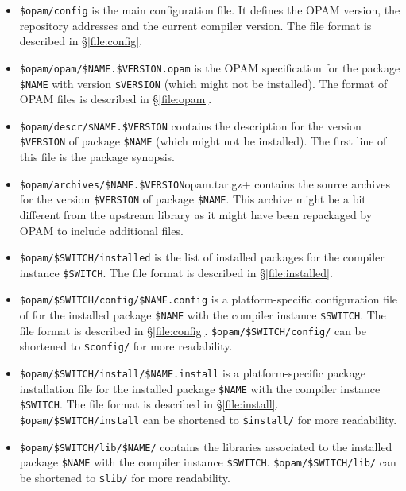 \documentclass[a4paper,11pt]{article}
\begin{document}
\begin{itemize}

\item {\tt \$opam/config} is the main configuration file. It defines
  the OPAM version, the repository addresses and the current compiler
  version. The file format is described in \S\ref{file:config}.

\item \verb+$opam/opam/$NAME.$VERSION.opam+ is the OPAM specification
  for the package \verb+$NAME+ with version \verb+$VERSION+ (which
  might not be installed). The format of OPAM files is described in
  \S\ref{file:opam}.

\item \verb+$opam/descr/$NAME.$VERSION+ contains the description for the
  version \verb+$VERSION+ of package \verb+$NAME+ (which might not be
  installed). The first line of this file is the package synopsis.

\item \verb+$opam/archives/$NAME.$VERSION+opam.tar.gz+ contains the source
  archives for the version \verb+$VERSION+ of package
  \verb+$NAME+. This archive might be a bit different from the
  upstream library as it might have been repackaged by OPAM to include
  additional files.

\item \verb+$opam/$SWITCH/installed+ is the list of installed
  packages for the compiler instance \verb+$SWITCH+. The file format
  is described in \S\ref{file:installed}.

\item \verb+$opam/$SWITCH/config/$NAME.config+ is a
  platform-specific configuration file of for the installed package
  \verb+$NAME+ with the compiler instance \verb+$SWITCH+. The file
  format is described in \S\ref{file:config}.
  \verb+$opam/$SWITCH/config/+ can be shortened to \verb+$config/+
  for more readability.

\item \verb+$opam/$SWITCH/install/$NAME.install+ is a
  platform-specific package installation file for the installed
  package \verb+$NAME+ with the compiler instance \verb+$SWITCH+. The
  file format is described in \S\ref{file:install}.
  \verb+$opam/$SWITCH/install+ can be shortened to \verb+$install/+
  for more readability.

\item \verb+$opam/$SWITCH/lib/$NAME/+ contains the libraries
  associated to the installed package \verb+$NAME+ with the compiler
  instance \verb+$SWITCH+. \verb+$opam/$SWITCH/lib/+ can be
  shortened to \verb+$lib/+ for more readability.


\end{itemize}
\end{document}
